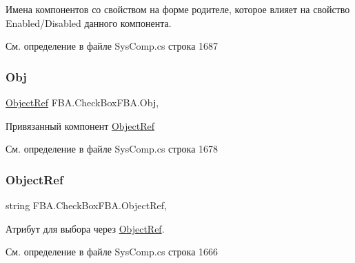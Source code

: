 Имена компонентов со свойством на форме родителе, которое влияет на свойство Enabled/\+Disabled данного компонента. 



См. определение в файле Sys\+Comp.\+cs строка 1687

\mbox{\label{class_f_b_a_1_1_check_box_f_b_a_ac27eb72e3b3f15cd6046e149acb4a2f5}} 
\subsubsection{\texorpdfstring{Obj}{Obj}}
{\footnotesize\ttfamily \mbox{\hyperlink{class_f_b_a_1_1_object_ref}{Object\+Ref}} F\+B\+A.\+Check\+Box\+F\+B\+A.\+Obj\hspace{0.3cm}{\ttfamily [get]}, {\ttfamily [set]}}



Привязанный компонент \mbox{\hyperlink{class_f_b_a_1_1_object_ref}{Object\+Ref}} 



См. определение в файле Sys\+Comp.\+cs строка 1678

\mbox{\label{class_f_b_a_1_1_check_box_f_b_a_ad488c7115c0ce2fb70da76502f810eaf}} 
\subsubsection{\texorpdfstring{Object\+Ref}{ObjectRef}}
{\footnotesize\ttfamily string F\+B\+A.\+Check\+Box\+F\+B\+A.\+Object\+Ref\hspace{0.3cm}{\ttfamily [get]}, {\ttfamily [set]}}



Атрибут для выбора через \mbox{\hyperlink{class_f_b_a_1_1_object_ref}{Object\+Ref}}. ~\newline




См. определение в файле Sys\+Comp.\+cs строка 1666

\mbox{\label{class_f_b_a_1_1_check_box_f_b_a_ac4872db37aaa6adc6dfab522aebc2d01}} 
